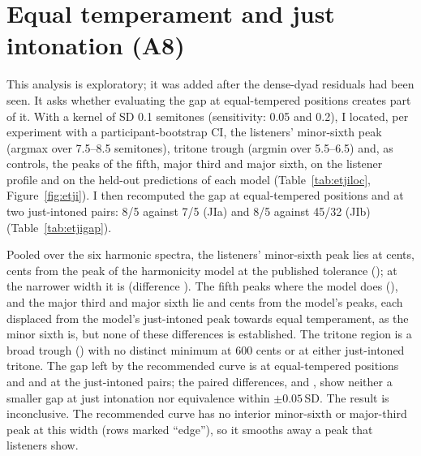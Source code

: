 \documentclass[11pt,a4paper]{article}
\newcommand{\SDu}{\,SD}
\begin{document}
\section{Equal temperament and just intonation (A8)}
\label{sec:etji}
This analysis is exploratory; it was added after the dense-dyad residuals had been seen. It
asks whether evaluating the gap at equal-tempered positions creates part of it. With a kernel
of SD 0.1 semitones (sensitivity: 0.05 and 0.2), I located, per experiment with a
participant-bootstrap CI, the listeners' minor-sixth peak (argmax over 7.5--8.5 semitones),
tritone trough (argmin over 5.5--6.5) and, as controls, the peaks of the fifth, major third and
major sixth, on the listener profile and on the held-out predictions of each model
(Table~\ref{tab:etjiloc}, Figure~\ref{fig:etji}). I then recomputed the gap at equal-tempered
positions and at two just-intoned pairs: 8/5 against 7/5 (JIa) and 8/5 against 45/32 (JIb)
(Table~\ref{tab:etjigap}).

Pooled over the six harmonic spectra, the listeners' minor-sixth peak lies at \ejLocMsix{}
cents, \ejDiffMsix{} cents from the peak of the harmonicity model at the published tolerance
(\ejModelMsix); at the narrower width it is \ejLocMsixNarrow{} (difference
\ejDiffMsixNarrow). The fifth peaks where the model does (\ejDiffPfive), and the major third
and major sixth lie \ejDiffMThree{} and \ejDiffMajSix{} cents from the model's peaks, each
displaced from the model's just-intoned peak towards equal temperament, as the minor sixth is,
but none of these differences is established. The tritone
region is a broad trough (\ejLocTT) with no distinct minimum at 600 cents or at either
just-intoned tritone. The gap left by the recommended curve is \ejGapET{} at equal-tempered
positions and \ejGapJIa{} and \ejGapJIb{} at the just-intoned pairs; the paired differences,
\ejGapJIaDiff{} and \ejGapJIbDiff, show neither a smaller gap at just intonation nor
equivalence within $\pm0.05$\SDu. The result is inconclusive. The recommended curve has no
interior minor-sixth or major-third peak at this width (rows marked ``edge''), so it smooths
away a peak that listeners show.

\begin{table}[h]
\centering
\caption{Peak and trough locations (cents) [participant-bootstrap CI; pooled rows, random
effects with Hartung--Knapp CI], kernel SD 0.1 semitones (exploratory). Equal-tempered and
just-intoned positions: m6 800/814; TT 600/583 (7/5) or 590 (45/32); P5 700/702; M3 400/386;
M6 900/884. $^\dagger$Point estimate on the edge of the search window. Edge: extremum on the
window edge in at least one spectrum.}
\label{tab:etjiloc}
\scriptsize
\setlength{\tabcolsep}{3pt}
\end{table}
\end{document}
